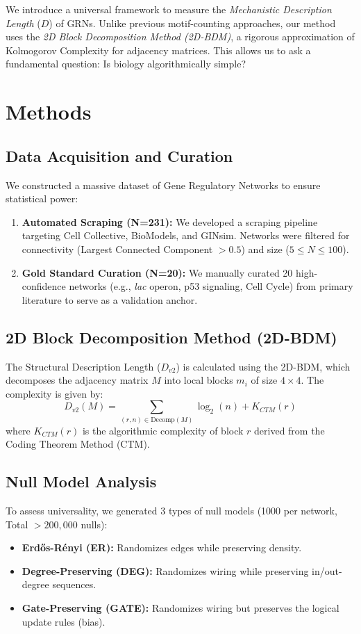 \documentclass{article}
\begin{document}
We introduce a universal framework to measure the \textit{Mechanistic Description Length} ($D$) of GRNs. Unlike previous motif-counting approaches, our method uses the \textit{2D Block Decomposition Method (2D-BDM)}, a rigorous approximation of Kolmogorov Complexity for adjacency matrices. This allows us to ask a fundamental question: Is biology algorithmically simple?

\section{Methods}

\subsection{Data Acquisition and Curation}
We constructed a massive dataset of Gene Regulatory Networks to ensure statistical power:
\begin{enumerate}
    \item \textbf{Automated Scraping (N=231):} We developed a scraping pipeline targeting Cell Collective, BioModels, and GINsim. Networks were filtered for connectivity (Largest Connected Component $> 0.5$) and size ($5 \le N \le 100$).
    \item \textbf{Gold Standard Curation (N=20):} We manually curated 20 high-confidence networks (e.g., \textit{lac} operon, p53 signaling, Cell Cycle) from primary literature to serve as a validation anchor.
\end{enumerate}

\subsection{2D Block Decomposition Method (2D-BDM)}
The Structural Description Length ($D_{v2}$) is calculated using the 2D-BDM, which decomposes the adjacency matrix $M$ into local blocks $m_i$ of size $4 \times 4$. The complexity is given by:
\begin{equation}
D_{v2}(M) = \sum_{(r, n) \in \text{Decomp}(M)} \log_2(n) + K_{CTM}(r)
\end{equation}
where $K_{CTM}(r)$ is the algorithmic complexity of block $r$ derived from the Coding Theorem Method (CTM).

\subsection{Null Model Analysis}
To assess universality, we generated 3 types of null models (1000 per network, Total $> 200,000$ nulls):
\begin{itemize}
    \item \textbf{Erdős-Rényi (ER):} Randomizes edges while preserving density.
    \item \textbf{Degree-Preserving (DEG):} Randomizes wiring while preserving in/out-degree sequences.
    \item \textbf{Gate-Preserving (GATE):} Randomizes wiring but preserves the logical update rules (bias).
\end{itemize}
\end{document}
